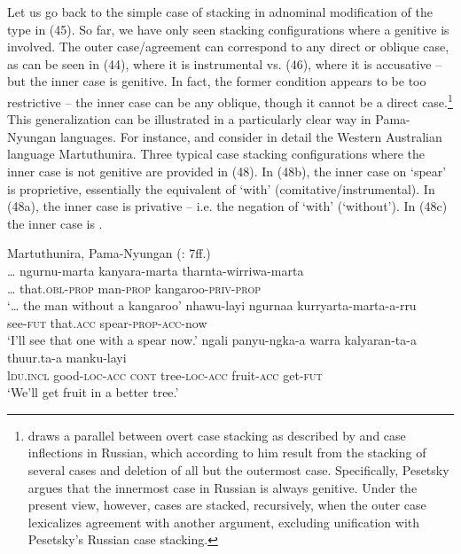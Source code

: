 \documentclass[output=paper]{langsci/langscibook}
\begin{document}
Let us go back to the simple case of stacking in adnominal modification of the type in (45). So far, we have only seen stacking configurations where a genitive is involved. The outer case\slash agreement can correspond to any direct or oblique case, as can be seen in (44), where it is instrumental vs. (46), where it is accusative – but the inner case is genitive. In fact, the former condition appears to be too restrictive – the inner case can be any oblique, though it cannot be a direct case.\footnote{\citet{Pesetsky2013} draws a parallel between overt case stacking as described by \citet{Richards2013} and case inflections in Russian, which according to him result from the stacking of several cases and deletion of all but the outermost case. Specifically, Pesetsky argues that the innermost case in Russian is always genitive. Under the present view, however, cases are stacked, recursively, when the outer case lexicalizes agreement with another argument, excluding unification with Pesetsky’s Russian case stacking.}  This generalization can be illustrated in a particularly clear way in Pama-Nyungan languages. For instance, \citet{Dench1988} and \citet{Dench1995} consider in detail the Western Australian language Martuthunira. Three typical case stacking configurations where the inner case is not genitive are provided in (48). In (48b), the inner case on ‘spear’ is proprietive, essentially the equivalent of  ‘with’ (comitative\slash instrumental). In (48a), the inner case is privative – i.e. the negation of ‘with’ (‘without’). In (48c) the inner case is . 

\ea%
    Martuthunira, Pama-Nyungan (\citealt{Dench1988}: 7ff.)\label{ex:manzini:48}\\
    \ea
    \gll … ngurnu-marta   kanyara-marta  tharnta-wirriwa-marta    \\
         … that.\textsc{obl-prop}   man-\textsc{prop}   kangaroo-\textsc{priv-prop}\\
    \glt ‘… the man without a kangaroo’
    \ex  
    \gll  nhawu-layi   ngurnaa  kurryarta-marta-a-rru    \\
         see-\textsc{fut}   that.\textsc{acc}   spear-\textsc{prop-acc}{}-now\\
    \glt ‘I'll see that one with a spear now.’
    \ex  
    \gll ngali   panyu-ngka-a   warra  kalyaran-ta-a   thuur.ta-a   manku-layi\\
         l\textsc{du.incl}   good-\textsc{loc-acc}  \textsc{cont}   tree-\textsc{loc-acc}   fruit-\textsc{acc}   get-\textsc{fut}\\
    \glt ‘We'll get fruit in a better tree.’ 
    \z
\z 
\end{document}
